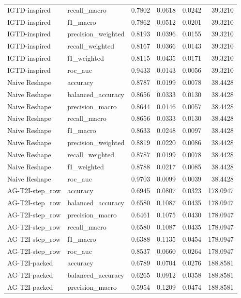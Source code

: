 \begin{tabular}{llrrrr}
IGTD-inspired & recall_macro & 0.7802 & 0.0618 & 0.0242 & 39.3210 \\
IGTD-inspired & f1_macro & 0.7862 & 0.0512 & 0.0201 & 39.3210 \\
IGTD-inspired & precision_weighted & 0.8193 & 0.0396 & 0.0155 & 39.3210 \\
IGTD-inspired & recall_weighted & 0.8167 & 0.0366 & 0.0143 & 39.3210 \\
IGTD-inspired & f1_weighted & 0.8115 & 0.0435 & 0.0171 & 39.3210 \\
IGTD-inspired & roc_auc & 0.9433 & 0.0143 & 0.0056 & 39.3210 \\
Naive Reshape & accuracy & 0.8787 & 0.0199 & 0.0078 & 38.4428 \\
Naive Reshape & balanced_accuracy & 0.8656 & 0.0333 & 0.0130 & 38.4428 \\
Naive Reshape & precision_macro & 0.8644 & 0.0146 & 0.0057 & 38.4428 \\
Naive Reshape & recall_macro & 0.8656 & 0.0333 & 0.0130 & 38.4428 \\
Naive Reshape & f1_macro & 0.8633 & 0.0248 & 0.0097 & 38.4428 \\
Naive Reshape & precision_weighted & 0.8819 & 0.0220 & 0.0086 & 38.4428 \\
Naive Reshape & recall_weighted & 0.8787 & 0.0199 & 0.0078 & 38.4428 \\
Naive Reshape & f1_weighted & 0.8788 & 0.0217 & 0.0085 & 38.4428 \\
Naive Reshape & roc_auc & 0.9703 & 0.0099 & 0.0039 & 38.4428 \\
AG-T2I-step_row & accuracy & 0.6945 & 0.0807 & 0.0323 & 178.0947 \\
AG-T2I-step_row & balanced_accuracy & 0.6580 & 0.1087 & 0.0435 & 178.0947 \\
AG-T2I-step_row & precision_macro & 0.6461 & 0.1075 & 0.0430 & 178.0947 \\
AG-T2I-step_row & recall_macro & 0.6580 & 0.1087 & 0.0435 & 178.0947 \\
AG-T2I-step_row & f1_macro & 0.6388 & 0.1135 & 0.0454 & 178.0947 \\
AG-T2I-step_row & roc_auc & 0.8537 & 0.0660 & 0.0264 & 178.0947 \\
AG-T2I-packed & accuracy & 0.6789 & 0.0704 & 0.0276 & 188.8581 \\
AG-T2I-packed & balanced_accuracy & 0.6265 & 0.0912 & 0.0358 & 188.8581 \\
AG-T2I-packed & precision_macro & 0.5954 & 0.1209 & 0.0474 & 188.8581 \\

\end{tabular}
